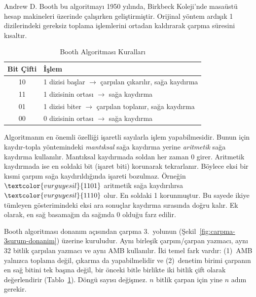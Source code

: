 \begin{bilginot}
Andrew D. Booth bu algoritmayı 1950 yılında, Birkbeck Koleji'nde masaüstü hesap makineleri üzerinde çalışırken geliştirmiştir. Orijinal yöntem ardışık 1 dizilerindeki gereksiz toplama işlemlerini ortadan kaldırarak çarpma süresini kısaltır.
\end{bilginot}

\begin{table}[htbp]
\centering
\caption{Booth Algoritması Kuralları}
\label{tab:booth-kurallar}
\begin{tabular}{c l}
\toprule
\textbf{Bit Çifti} & \textbf{İşlem} \\
\midrule
10 & 1 dizisi başlar $\rightarrow$ çarpılan çıkarılır, sağa kaydırma \\
11 & 1 dizisinin ortası $\rightarrow$ sağa kaydırma \\
01 & 1 dizisi biter $\rightarrow$ çarpılan toplanır, sağa kaydırma \\
00 & 0 dizisinin ortası $\rightarrow$ sağa kaydırma \\
\bottomrule
\end{tabular}
\end{table}

Algoritmanın en önemli özelliği işaretli sayılarla işlem yapabilmesidir. Bunun için kaydır-topla yöntemindeki \emph{mantıksal} sağa kaydırma yerine \emph{aritmetik} sağa kaydırma kullanılır. Mantıksal kaydırmada soldan her zaman 0 girer. Aritmetik kaydırmada ise en soldaki bit (işaret biti) korunarak tekrarlanır. Böylece eksi bir kısmi çarpım sağa kaydırıldığında işareti bozulmaz. Örneğin $\textcolor{vurguyesil}{1101}$ aritmetik sağa kaydırılırsa $\textcolor{vurguyesil}{1110}$ olur. En soldaki 1 korunmuştur. Bu sayede ikiye tümleyen gösterimindeki eksi ara sonuçlar kaydırma sırasında doğru kalır. Ek olarak, en sağ basamağın da sağında 0 olduğu farz edilir.

Booth algoritması donanım açısından çarpma 3.\ yolunun (Şekil~\ref{fig:carpma-3surum-donanim}) üzerine kuruludur. Aynı birleşik çarpım/çarpan yazmacı, aynı 32 bitlik çarpılan yazmacı ve aynı AMB kullanılır. İki temel fark vardır: (1)~AMB yalnızca toplama değil, çıkarma da yapabilmelidir ve (2)~denetim birimi çarpanın en sağ bitini tek başına değil, bir önceki bitle birlikte iki bitlik çift olarak değerlendirir (Tablo~\ref{tab:booth-kurallar}). Döngü sayısı değişmez. $n$ bitlik çarpan için yine $n$ adım gerekir.


